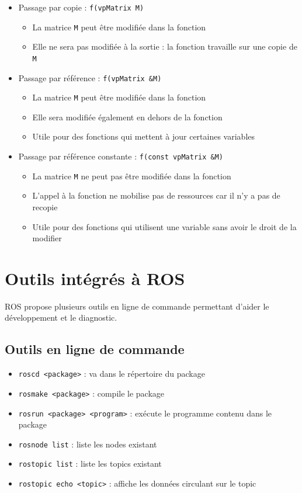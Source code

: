 \documentclass[12pt,a4paper]{article}
\begin{document}
\begin{itemize}
\item Passage par copie : \texttt{f(vpMatrix M)}
\begin{itemize}
\item La matrice \texttt{M} peut être modifiée dans la fonction
\item Elle ne sera pas modifiée à la sortie : la fonction travaille sur une copie de \texttt{M}
\end{itemize}
\item Passage par référence : \texttt{f(vpMatrix \&M)}
\begin{itemize}
\item La matrice \texttt{M} peut être modifiée dans la fonction
\item Elle sera modifiée également en dehors de la fonction
\item Utile pour des fonctions qui mettent à jour certaines variables
\end{itemize}
\item Passage par référence constante : \texttt{f(const vpMatrix \&M)}
\begin{itemize}
\item La matrice \texttt{M} ne peut pas être modifiée dans la fonction
\item L'appel à la fonction ne mobilise pas de ressources car il n'y a pas de recopie
\item Utile pour des fonctions qui utilisent une variable sans avoir le droit de la modifier
\end{itemize}
\end{itemize}



\section{Outils intégrés à ROS}
\label{sec:lignecomm}

ROS propose plusieurs outils en ligne de commande permettant d'aider le développement et le diagnostic.
\subsection{Outils en ligne de commande}
\begin{itemize}
\item \texttt{roscd <package>} : va dans le répertoire du package
 \item \texttt{rosmake <package>} : compile le package
 \item \texttt{rosrun <package> <program>} : exécute le programme contenu dans le package 
 \item \texttt{rosnode list} : liste les nodes existant
 \item \texttt{rostopic list} : liste les topics existant
 \item \texttt{rostopic echo <topic>} : affiche les données circulant sur le topic
\end{itemize}
\end{document}
